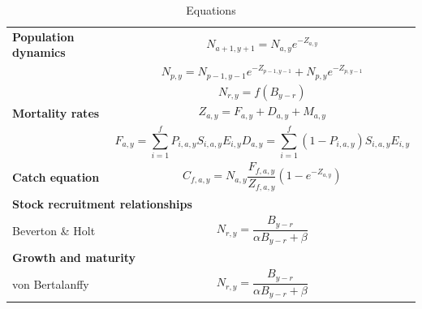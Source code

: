 \documentclass[a4paper, 10pt]{article}
\begin{document}
\begin{table}
\caption{Equations}
\label{tab:datasumm}
\begin{tabular}{lp{10cm}}
\toprule
\toprule

\textbf{Population dynamics} &
 \begin{equation} N_{a+1, y+1} = N_{a,y} e^{-Z_{a,y}} \end{equation} \\
%
 &
 \begin{equation} N_{p,y} = N_{p-1, y-1} e^{-Z_{p-1, y-1}} + N_{p,y} e ^{-Z_{p, y-1}} \end{equation} \\
%
 &  \begin{equation} N_{r,y} = f(B_{y-r}) \end{equation} \\
\midrule

\textbf{Mortality rates} & \begin{equation} Z_{a,y} = F_{a,y} + D_{a,y} + M_{a,y} \end{equation} \\
%
 & \begin{subequations} 
\begin{equation} F_{a,y} = \sum_{i=1}^f P_{i,a,y} S_{i,a,y} E_{i,y} \end{equation}
\begin{equation} D_{a,y} = \sum_{i=1}^f \left(1- P_{i,a,y}\right) S_{i,a,y} E_{i,y} \end{equation}
\end{subequations}\\
\midrule

\textbf{Catch equation} & \begin{equation} C_{f,a,y} = N_{a,y} \frac{F_{f,a,y}}{Z_{f,a,y}} \left(1 - e^{-Z_{a,y}} \right) \end{equation} \\
\midrule

%
\multicolumn{2}{l}{\textbf{Stock recruitment relationships}} \\
\addlinespace
Beverton \& Holt & \begin{equation} N_{r,y} = \frac{B_{y-r}}{\alpha B_{y-r} + \beta} \end{equation} \\
\bottomrule

\multicolumn{2}{l}{\textbf{Growth and maturity}} \\
von Bertalanffy & \begin{equation} N_{r,y} = \frac{B_{y-r}}{\alpha B_{y-r} + \beta} \end{equation} \\
\bottomrule
\end{tabular}
\end{table}
\end{document}
